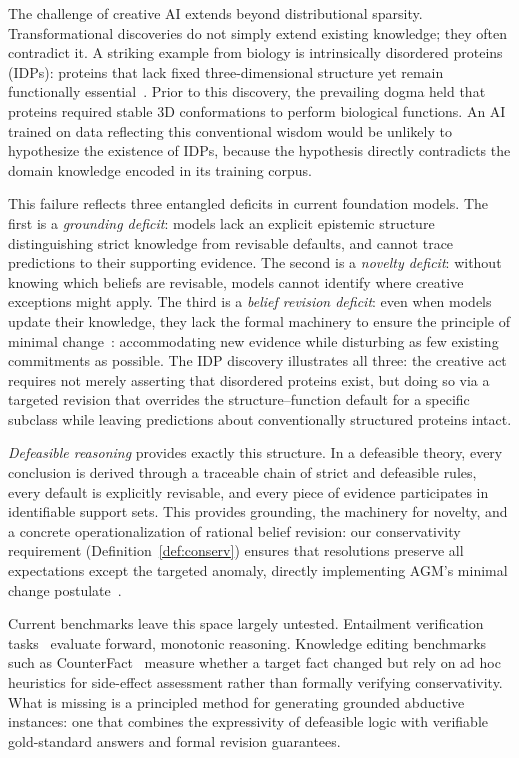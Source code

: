 \documentclass{article}
\theoremstyle{definition}
\begin{document}
The challenge of creative AI extends beyond distributional sparsity. Transformational discoveries do not simply extend existing knowledge; they often contradict it. A striking example from biology is intrinsically disordered proteins (IDPs): proteins that lack fixed three-dimensional structure yet remain functionally essential~\cite{dunker2001intrinsically}. Prior to this discovery, the prevailing dogma held that proteins required stable 3D conformations to perform biological functions. An AI trained on data reflecting this conventional wisdom would be unlikely to hypothesize the existence of IDPs, because the hypothesis directly contradicts the domain knowledge encoded in its training corpus.

This failure reflects three entangled deficits in current foundation models. The first is a \textit{grounding deficit}: models lack an explicit epistemic structure distinguishing strict knowledge from revisable defaults, and cannot trace predictions to their supporting evidence. The second is a \textit{novelty deficit}: without knowing which beliefs are revisable, models cannot identify where creative exceptions might apply. The third is a \textit{belief revision deficit}: even when models update their knowledge, they lack the formal machinery to ensure the principle of minimal change~\cite{alchourron1985logic}: accommodating new evidence while disturbing as few existing commitments as possible. The IDP discovery illustrates all three: the creative act requires not merely asserting that disordered proteins exist, but doing so via a targeted revision that overrides the structure--function default for a specific subclass while leaving predictions about conventionally structured proteins intact.

\textit{Defeasible reasoning} provides exactly this structure. In a defeasible theory, every conclusion is derived through a traceable chain of strict and defeasible rules, every default is explicitly revisable, and every piece of evidence participates in identifiable support sets. This provides grounding, the machinery for novelty, and a concrete operationalization of rational belief revision: our conservativity requirement (Definition~\ref{def:conserv}) ensures that resolutions preserve all expectations except the targeted anomaly, directly implementing AGM's minimal change postulate~\cite{gardenfors1988knowledge, katsuno1991propositional}.

Current benchmarks leave this space largely untested. Entailment verification tasks~\cite{tafjord2021proofwriter} evaluate forward, monotonic reasoning. Knowledge editing benchmarks such as CounterFact~\cite{meng2022locating} measure whether a target fact changed but rely on ad hoc heuristics for side-effect assessment rather than formally verifying conservativity. What is missing is a principled method for generating grounded abductive instances: one that combines the expressivity of defeasible logic with verifiable gold-standard answers and formal revision guarantees.
\end{document}
